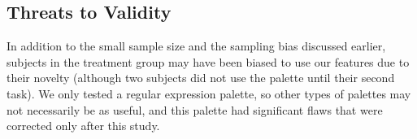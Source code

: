 \documentclass[10pt, conference, compsocconf]{IEEEtran}
\begin{document}
%
%
%	
%	
%	
%		

\subsection{Threats to Validity}
In addition to the small sample size and the sampling bias discussed earlier, subjects in the treatment group may have been biased to use our features due to their novelty (although two subjects did not use the palette until their second task). We only tested a regular expression palette, so other types of palettes may not necessarily be as useful, and this palette had significant flaws that were corrected only after this study.
\end{document}

